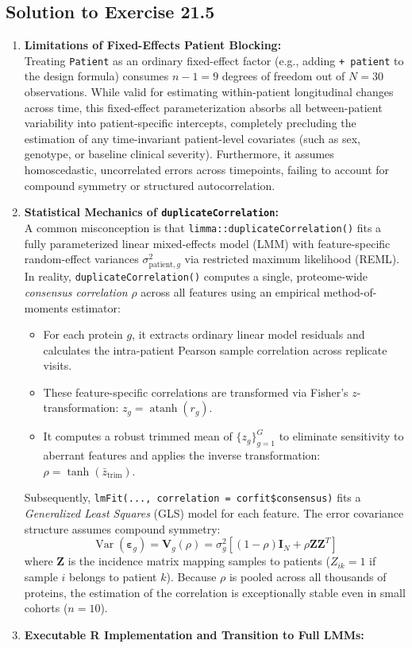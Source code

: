 \documentclass[11pt,twoside,openright]{book}
\begin{document}
\subsection*{Solution to Exercise 21.5}
\begin{enumerate}
    \item \textbf{Limitations of Fixed-Effects Patient Blocking:}\\
    Treating \texttt{Patient} as an ordinary fixed-effect factor (e.g., adding \texttt{+ patient} to the design formula) consumes $n - 1 = 9$ degrees of freedom out of $N = 30$ observations. While valid for estimating within-patient longitudinal changes across time, this fixed-effect parameterization absorbs all between-patient variability into patient-specific intercepts, completely precluding the estimation of any time-invariant patient-level covariates (such as sex, genotype, or baseline clinical severity). Furthermore, it assumes homoscedastic, uncorrelated errors across timepoints, failing to account for compound symmetry or structured autocorrelation.
    
    \item \textbf{Statistical Mechanics of \texttt{duplicateCorrelation}:}\\
    A common misconception is that \texttt{limma::duplicateCorrelation()} fits a fully parameterized linear mixed-effects model (LMM) with feature-specific random-effect variances $\sigma_{\text{patient}, g}^2$ via restricted maximum likelihood (REML). In reality, \texttt{duplicateCorrelation()} computes a single, proteome-wide \textit{consensus correlation} $\rho$ across all features using an empirical method-of-moments estimator:
    \begin{itemize}
        \item For each protein $g$, it extracts ordinary linear model residuals and calculates the intra-patient Pearson sample correlation across replicate visits.
        \item These feature-specific correlations are transformed via Fisher's $z$-transformation: $z_g = \operatorname{atanh}(r_g)$.
        \item It computes a robust trimmed mean of $\{z_g\}_{g=1}^G$ to eliminate sensitivity to aberrant features and applies the inverse transformation: $\rho = \tanh(\bar{z}_{\text{trim}})$.
    \end{itemize}
    Subsequently, \texttt{lmFit(..., correlation = corfit\$consensus)} fits a \textit{Generalized Least Squares} (GLS) model for each feature. The error covariance structure assumes compound symmetry:
    $$\operatorname{Var}(\boldsymbol{\varepsilon}_g) = \mathbf{V}_g(\rho) = \sigma_g^2 \left[ (1 - \rho)\mathbf{I}_{N} + \rho \mathbf{Z} \mathbf{Z}^T \right]$$
    where $\mathbf{Z}$ is the incidence matrix mapping samples to patients ($Z_{ik} = 1$ if sample $i$ belongs to patient $k$). Because $\rho$ is pooled across all thousands of proteins, the estimation of the correlation is exceptionally stable even in small cohorts ($n = 10$).
    
    \item \textbf{Executable R Implementation and Transition to Full LMMs:}
\end{enumerate}
\end{document}
